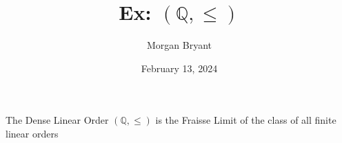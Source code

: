 \documentclass[a4paper]{article}
\title{Ex: \(( \mathbb {Q},  \leq )\)}
\date{February 13, 2024}
\author{Morgan Bryant}
\begin{document}
\maketitle
\par{The Dense Linear Order \(( \mathbb {Q},  \leq )\) is the Fraisse Limit of the class of all finite linear orders}
\printbibliography
\end{document}
